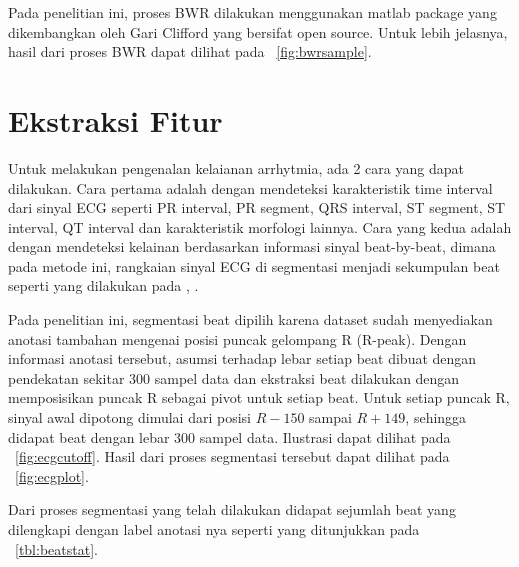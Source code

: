 Pada penelitian ini, proses BWR dilakukan menggunakan matlab package yang
dikembangkan oleh Gari Clifford \cite{clifford-2005} yang bersifat open source.
Untuk lebih jelasnya, hasil dari proses BWR dapat dilihat pada
\pic~\ref{fig:bwrsample}.


\section{Ekstraksi Fitur}
\label{sec:ekstractfitur}
Untuk melakukan pengenalan kelaianan arrhytmia, ada 2 cara yang dapat dilakukan.
Cara pertama adalah dengan mendeteksi karakteristik time interval dari sinyal
ECG seperti PR interval, PR segment, QRS interval, ST segment, ST interval, QT
interval dan karakteristik morfologi lainnya. Cara yang kedua adalah dengan
mendeteksi kelainan berdasarkan informasi sinyal beat-by-beat, dimana pada
metode ini, rangkaian sinyal ECG di segmentasi menjadi sekumpulan beat seperti
yang dilakukan pada \cite{Ghongade.1}, \cite{zhao-2005}.

Pada penelitian ini, segmentasi beat dipilih karena dataset sudah menyediakan 
anotasi tambahan mengenai posisi puncak gelompang R (R-peak). Dengan informasi
anotasi tersebut, asumsi terhadap lebar setiap beat dibuat dengan pendekatan
sekitar 300 sampel data dan ekstraksi beat dilakukan dengan memposisikan puncak
R sebagai pivot untuk setiap beat. Untuk setiap puncak R, sinyal awal dipotong
dimulai dari posisi $R-150$ sampai $R+149$, sehingga didapat beat dengan lebar
300 sampel data. Ilustrasi dapat dilihat pada \pic~\ref{fig:ecgcutoff}. Hasil 
dari proses segmentasi tersebut dapat dilihat pada \pic~\ref{fig:ecgplot}.



Dari proses segmentasi yang telah dilakukan didapat sejumlah beat yang
dilengkapi dengan label anotasi nya seperti yang ditunjukkan pada
\tab~\ref{tbl:beatstat}.


